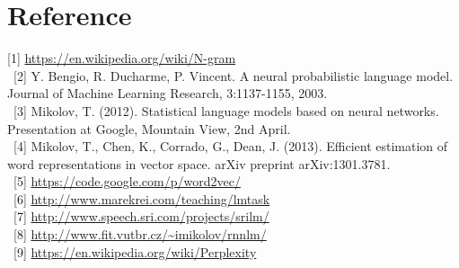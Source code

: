 \documentclass[11pt, oneside]{article}   	%
\begin{document}
\section{Reference}
[1] \url{https://en.wikipedia.org/wiki/N-gram} \\ \ 
[2] Y. Bengio, R. Ducharme, P. Vincent. A neural probabilistic language model. Journal of Machine Learning Research, 3:1137-1155, 2003.\\ \
[3] Mikolov, T. (2012). Statistical language models based on neural networks. Presentation at Google, Mountain View, 2nd April.\\ \
[4] Mikolov, T., Chen, K., Corrado, G.,  Dean, J. (2013). Efficient estimation of word representations in vector space. arXiv preprint arXiv:1301.3781.\\ \
[5] \url{https://code.google.com/p/word2vec/}\\ \
[6] \url{http://www.marekrei.com/teaching/lmtask}\\ \
[7] \url{http://www.speech.sri.com/projects/srilm/}\\ \
[8] \url{http://www.fit.vutbr.cz/~imikolov/rnnlm/}\\ \
[9] \url{https://en.wikipedia.org/wiki/Perplexity}\\ \
\end{document}

